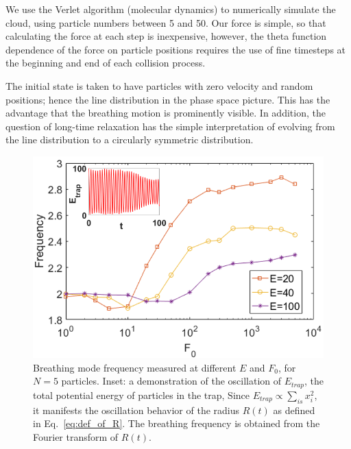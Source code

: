 \documentclass[onecolumn,pra]{revtex4-1}
\begin{document}
We use the Verlet algorithm (molecular dynamics) to numerically simulate the cloud, using particle
numbers between 5 and 50.  Our force is simple, so that calculating the force at each step is
inexpensive, however, the theta function dependence of the force on particle positions requires the
use of fine timesteps at the beginning and end of each collision process.

The initial state is taken to have particles with zero velocity and random positions; hence the line
distribution in the phase space picture.  This has the advantage that the breathing motion is
prominently visible.  In addition, the question of long-time relaxation has the simple
interpretation of evolving from the line distribution to a circularly symmetric distribution.





\begin{figure}[tbp]
\center
\includegraphics[scale=0.32]{ZhiyuPictures/freq_scanF_differentE_log_2_with_oscillation_demo.png}
\caption{Breathing mode frequency measured at different $E$ and $F_0$, for $N=5$ particles. Inset: a
  demonstration of the oscillation of $E_{trap}$, the total potential energy of particles in the
  trap, Since $E_{trap}\propto \sum_{is}{x_i^2}$, it manifests the oscillation behavior of the
  radius $R(t)$ as defined in Eq.~\ref{eq:def_of_R}.  The breathing frequency is obtained from the
  Fourier transform of $R(t)$.}
\label{fig:Breathingfrequency1}
\end{figure}
\end{document}
